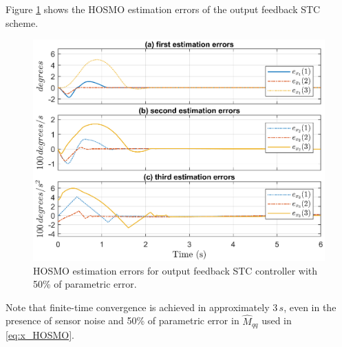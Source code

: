 Figure \ref{fig:CDC_result3} shows the HOSMO estimation errors of the output feedback STC scheme. 
%
\begin{figure}[!htpb]
\centering
\includegraphics[width=1.0\columnwidth]{results/CDC_result3}
\caption{HOSMO estimation errors for output feedback STC controller with 50\% of parametric error.}
\label{fig:CDC_result3}
\end{figure}
%
Note that finite-time convergence is achieved in approximately $3\,s$, even in the presence of sensor noise and 50\% of parametric error in $\widehat{M}_{qq}$ used in \eqref{eq:x_HOSMO}.
%


